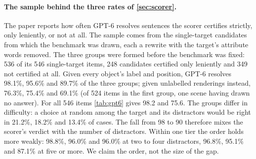 \paragraph{The sample behind the three rates of \cref{sec:scorer}.}
The paper reports how often GPT-6 resolves sentences the scorer certifies strictly, only leniently, or not at all.
The sample comes from the single-target candidates from which the benchmark was drawn, each a rewrite with the target's attribute words removed.
The three groups were formed before the benchmark was fixed: 536 of its 546 single-target items, 248 candidates certified only leniently and 349 not certified at all.
Given every object's label and position, GPT-6 resolves 98.1\%, 95.6\% and 89.7\% of the three groups; given unlabelled renderings instead, 76.3\%, 75.4\% and 69.1\% (of 524 items in the first group, one scene having drawn no answer).
For all 546 items \cref{tab:gpt6} gives 98.2 and 75.6.
The groups differ in difficulty: a choice at random among the target and its distractors would be right in 21.2\%, 18.2\% and 13.4\% of cases. The fall from 98 to 90 therefore mixes the scorer's verdict with the number of distractors.
Within one tier the order holds more weakly: 98.8\%, 96.0\% and 96.0\% at two to four distractors, 96.8\%, 95.1\% and 87.1\% at five or more.
We claim the order, not the size of the gap.

